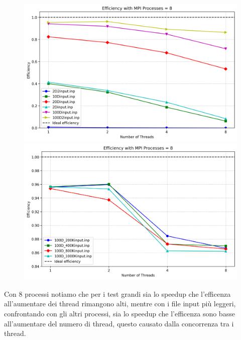 \documentclass{article}
\begin{document}
\begin{figure}[ht]
\begin{minipage}{0.4\textwidth}
      \includegraphics[width=\linewidth]{../test_csv/plots/efficency/plot_omp_mpi_8_small_slurm.png}
    \end{minipage}
    \begin{minipage}{0.4\textwidth}
      \centering
      \includegraphics[width=\linewidth]{../test_csv/plots/efficency/plot_omp_mpi_8_big_slurm.png}
    \end{minipage}
  \end{figure}

  Con 8 processi notiamo che per i test grandi sia lo speedup che l'efficenza all'aumentare dei thread rimangono alti, mentre con i file input più leggeri, confrontando 
  con gli altri processi, sia lo speedup che l'efficenza sono basse all'aumentare del numero di thread, questo causato dalla concorrenza tra i thread. 
\end{document}
